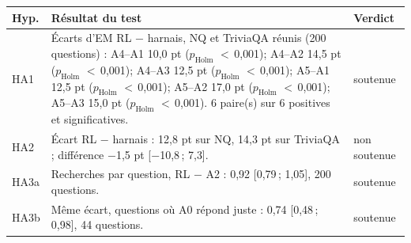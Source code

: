 \begin{tabular}{@{}lp{7.6cm}l@{}}
\toprule
Hyp. & Résultat du test & Verdict\\
\midrule
HA1 & Écarts d'EM RL $-$ harnais, NQ et TriviaQA réunis (200 questions) : A4--A1 10{,}0 pt ($p_{\text{Holm}}$ $<$\,0{,}001); A4--A2 14{,}5 pt ($p_{\text{Holm}}$ $<$\,0{,}001); A4--A3 12{,}5 pt ($p_{\text{Holm}}$ $<$\,0{,}001); A5--A1 12{,}5 pt ($p_{\text{Holm}}$ $<$\,0{,}001); A5--A2 17{,}0 pt ($p_{\text{Holm}}$ $<$\,0{,}001); A5--A3 15{,}0 pt ($p_{\text{Holm}}$ $<$\,0{,}001). 6 paire(s) sur 6 positives et significatives. & soutenue\\
HA2 & Écart RL $-$ harnais : 12{,}8 pt sur NQ, 14{,}3 pt sur TriviaQA ; différence $-$1{,}5 pt [$-$10{,}8\,; 7{,}3]. & non soutenue\\
HA3a & Recherches par question, RL $-$ A2 : 0{,}92 [0{,}79\,; 1{,}05], 200 questions. & soutenue\\
HA3b & Même écart, questions où A0 répond juste : 0{,}74 [0{,}48\,; 0{,}98], 44 questions. & soutenue\\
\bottomrule
\end{tabular}
